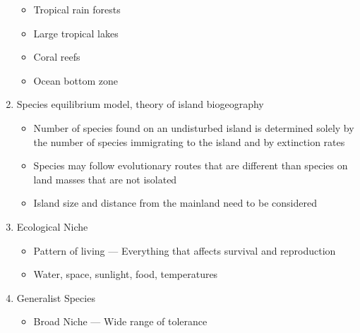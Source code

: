 \documentclass[12pt]{article}
\begin{document}
\begin{enumerate}
    \begin{itemize}

      \item Tropical rain forests

      \item Large tropical lakes

      \item Coral reefs

      \item Ocean bottom zone

    \end{itemize}

  \item Species equilibrium model, theory of island biogeography

    \begin{itemize}

      \item Number of species found on an undisturbed island is determined solely by the number of species immigrating to the island and by extinction rates

      \item Species may follow evolutionary routes that are different than species on land masses that are not isolated

      \item Island size and distance from the mainland need to be considered

    \end{itemize}

  \item Ecological Niche

    \begin{itemize}

      \item Pattern of living — Everything that affects survival and reproduction

      \item Water, space, sunlight, food, temperatures

    \end{itemize}

  \item Generalist Species

    \begin{itemize}

      \item Broad Niche — Wide range of tolerance

    \end{itemize}


\end{enumerate}
\end{document}
